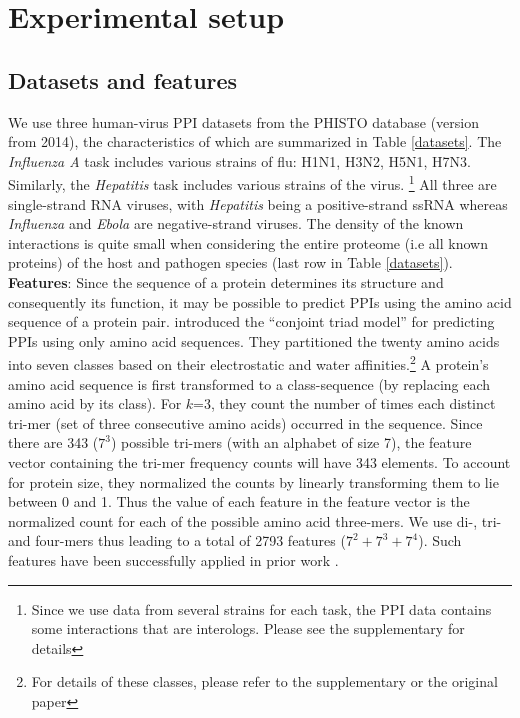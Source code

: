 \documentclass[runningheads,a4paper]{llncs}
\begin{document}
\section{Experimental setup}
\subsection{Datasets and features}
\label{sec:datasets}
We use three human-virus PPI datasets from the PHISTO \cite{phisto} database (version from 2014), the characteristics of which are summarized in Table \ref{datasets}. 
The \textit{Influenza A} task includes various strains of flu: H1N1, H3N2, H5N1, H7N3. 
Similarly, the \textit{Hepatitis} task includes various strains of the virus. \footnote{Since we use data from several strains for each task, the PPI data contains some interactions that are interologs. Please see the supplementary for details} 
All three are single-strand RNA viruses, with \textit{Hepatitis} being a positive-strand ssRNA whereas \textit{Influenza} and \textit{Ebola} are negative-strand viruses. %
The density of the known interactions is quite small when considering the entire proteome (i.e all known proteins) of the host and pathogen species (last row in Table \ref{datasets}).\\
\noindent\textbf{Features}: 
Since the sequence of a protein determines its structure and consequently its function, it may be possible to predict PPIs using the amino acid sequence of a protein pair. \cite{shen:2007} introduced the ``conjoint triad model'' for predicting PPIs using only amino acid sequences. They partitioned the twenty amino acids into seven classes based on their electrostatic and water affinities.\footnote{For details of these classes, please refer to the supplementary or the original paper}
A protein's amino acid sequence is first transformed to a class-sequence (by replacing each amino acid by its class).
For $k$=3, they count the number of times each distinct tri-mer (set of three consecutive amino acids) occurred in the sequence.
Since there are 343 ($7^3$) possible tri-mers (with an alphabet of size 7), the feature vector containing the tri-mer frequency counts will have 343 elements.
To account for protein size, they normalized the counts by linearly transforming them to lie between 0 and 1.
Thus the value of each feature in the feature vector is the normalized count for each of the possible amino acid three-mers. We use di-, tri- and four-mers thus leading to a total of 2793 features ($7^2 + 7^3 + 7^4$).
Such features have been successfully applied in prior work \cite{dyer07,me_ismb_2013}.
\end{document}
